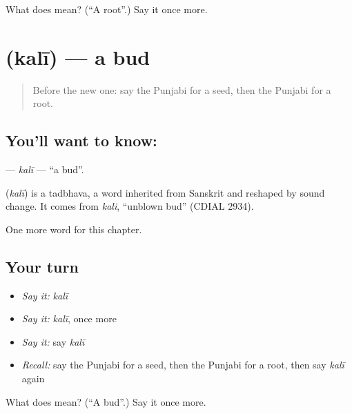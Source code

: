 \begin{tcolorbox}[breakable,colback=teal!4,colframe=teal!35!black,title={Before you move on}]
What does  mean? (\textquotedblleft{}A root\textquotedblright{}.) Say it once more.
\end{tcolorbox}
\section[\texorpdfstring{\pa{ਕਲੀ} (kalī)}{ਕਲੀ (kalī)}]{ (kalī) — a bud}

\label{lesson:PA-C126-kali}



\begin{quote}
Before the new one: say the Punjabi for a seed, then the Punjabi for a root.
\end{quote}

\subsection*{You'll want to know: }
\textbf{} — \emph{kalī} — \textquotedblleft{}a bud\textquotedblright{}.

\begin{cousinweb}
\textbf{} (\emph{kalī}) is a tadbhava, a word inherited from Sanskrit and reshaped by sound change. It comes from \emph{kali}, \textquotedblleft{}unblown bud\textquotedblright{} (CDIAL 2934).
\end{cousinweb}

\begin{grammarlens}[title={What you've built}]
One more word for this chapter.
\end{grammarlens}

\subsection*{Your turn}
\begin{itemize}
\raggedright
  \item \emph{Say it:} \emph{kalī}
  \item \emph{Say it:} \emph{kalī}, once more
  \item \emph{Say it:} say \emph{kalī}
  \item \emph{Recall:} say the Punjabi for a seed, then the Punjabi for a root, then say \emph{kalī} again
\end{itemize}

\begin{tcolorbox}[breakable,colback=teal!4,colframe=teal!35!black,title={Before you move on}]
What does  mean? (\textquotedblleft{}A bud\textquotedblright{}.) Say it once more.
\end{tcolorbox}
